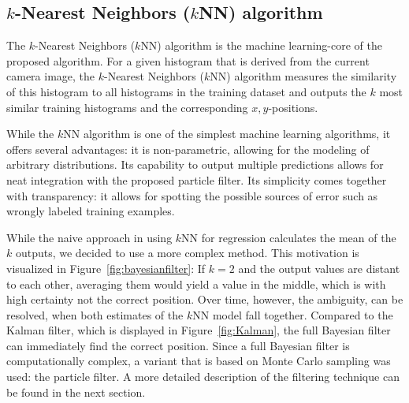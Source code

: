 \documentclass{report}
\begin{document}
\subsection{$k$-Nearest Neighbors ($k$NN) algorithm}


The $k$-Nearest Neighbors ($k$NN) algorithm is the machine
learning-core of the proposed algorithm. For a given histogram that is
derived from the current camera image, the $k$-Nearest Neighbors
($k$NN) algorithm measures the similarity of this histogram to all
histograms in the training dataset and outputs the $k$ most similar
training histograms and the corresponding $x,y$-positions.

While the $k$NN algorithm is one of the simplest machine learning
algorithms, it offers several advantages: it is non-parametric,
allowing for the modeling of arbitrary distributions. Its capability
to output multiple predictions allows for neat integration with the
proposed particle filter. Its simplicity comes together with
transparency: it allows for spotting the possible sources of error
such as wrongly labeled training examples.

While the naive approach in using $k$NN for regression calculates the
mean of the $k$ outputs, we decided to use a more complex method. This
motivation is visualized in Figure~\ref{fig:bayesianfilter}: If $k=2$
and the output values are distant to each other, averaging them would
yield a value in the middle, which is with high certainty not the
correct position. Over time, however, the ambiguity, can be resolved,
when both estimates of the $k$NN model fall together. Compared to the
Kalman filter, which is displayed in Figure~\ref{fig:Kalman}, the full
Bayesian filter can immediately find the correct position. Since a
full Bayesian filter is computationally complex, a variant that is
based on Monte Carlo sampling was used: the particle filter. A more
detailed description of the filtering technique can be found in the
next section.
\end{document}
